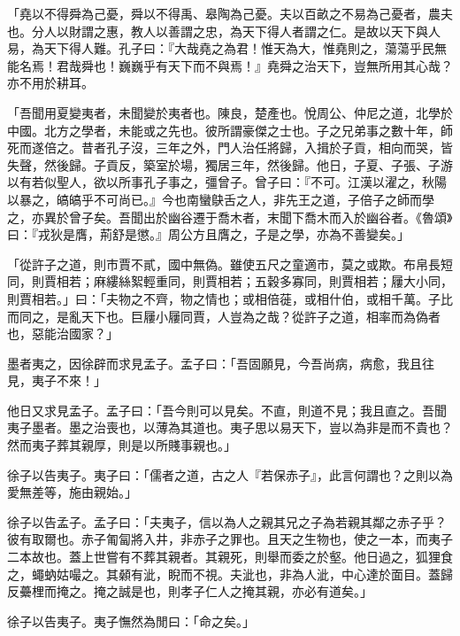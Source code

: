 \begin{pinyinscope}
「堯以不得舜為己憂，舜以不得禹、皋陶為己憂。夫以百畝之不易為己憂者，農夫也。分人以財謂之惠，教人以善謂之忠，為天下得人者謂之仁。是故以天下與人易，為天下得人難。孔子曰：『大哉堯之為君！惟天為大，惟堯則之，蕩蕩乎民無能名焉！君哉舜也！巍巍乎有天下而不與焉！』堯舜之治天下，豈無所用其心哉？亦不用於耕耳。

「吾聞用夏變夷者，未聞變於夷者也。陳良，楚產也。悅周公、仲尼之道，北學於中國。北方之學者，未能或之先也。彼所謂豪傑之士也。子之兄弟事之數十年，師死而遂倍之。昔者孔子沒，三年之外，門人治任將歸，入揖於子貢，相向而哭，皆失聲，然後歸。子貢反，築室於場，獨居三年，然後歸。他日，子夏、子張、子游以有若似聖人，欲以所事孔子事之，彊曾子。曾子曰：『不可。江漢以濯之，秋陽以暴之，皜皜乎不可尚已。』今也南蠻鴃舌之人，非先王之道，子倍子之師而學之，亦異於曾子矣。吾聞出於幽谷遷于喬木者，末聞下喬木而入於幽谷者。《魯頌》曰：『戎狄是膺，荊舒是懲。』周公方且膺之，子是之學，亦為不善變矣。」

「從許子之道，則市賈不貳，國中無偽。雖使五尺之童適市，莫之或欺。布帛長短同，則賈相若；麻縷絲絮輕重同，則賈相若；五穀多寡同，則賈相若；屨大小同，則賈相若。」曰：「夫物之不齊，物之情也；或相倍蓰，或相什伯，或相千萬。子比而同之，是亂天下也。巨屨小屨同賈，人豈為之哉？從許子之道，相率而為偽者也，惡能治國家？」

墨者夷之，因徐辟而求見孟子。孟子曰：「吾固願見，今吾尚病，病愈，我且往見，夷子不來！」

他日又求見孟子。孟子曰：「吾今則可以見矣。不直，則道不見；我且直之。吾聞夷子墨者。墨之治喪也，以薄為其道也。夷子思以易天下，豈以為非是而不貴也？然而夷子葬其親厚，則是以所賤事親也。」

徐子以告夷子。夷子曰：「儒者之道，古之人『若保赤子』，此言何謂也？之則以為愛無差等，施由親始。」

徐子以告孟子。孟子曰：「夫夷子，信以為人之親其兄之子為若親其鄰之赤子乎？彼有取爾也。赤子匍匐將入井，非赤子之罪也。且天之生物也，使之一本，而夷子二本故也。蓋上世嘗有不葬其親者。其親死，則舉而委之於壑。他日過之，狐狸食之，蠅蚋姑嘬之。其顙有泚，睨而不視。夫泚也，非為人泚，中心達於面目。蓋歸反虆梩而掩之。掩之誠是也，則孝子仁人之掩其親，亦必有道矣。」

徐子以告夷子。夷子憮然為閒曰：「命之矣。」


\end{pinyinscope}